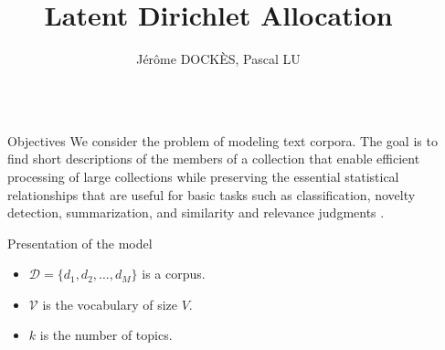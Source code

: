 \documentclass[final]{beamer}
\title{Latent Dirichlet Allocation} %
\author{J\'er\^ome DOCK\`ES, Pascal LU} %
\institute{\'Ecole Normale Sup\'erieure de Cachan $-$ \today} %
\newlength{\sepwid}
\newlength{\onecolwid}
\begin{document}

\setlength{\belowcaptionskip}{2ex} %
\setlength\belowdisplayshortskip{2ex} %

\begin{frame}[t] %

\begin{columns}[t] %

\begin{column}{\sepwid}\end{column} %

\begin{column}{\onecolwid} %


\begin{alertblock}{Objectives}
We consider the problem of modeling text corpora. The goal is to find short descriptions of the members of a collection that enable efficient processing of large collections while preserving the essential statistical relationships that are useful for basic tasks such as classification, novelty detection, summarization, and similarity and relevance judgments  \cite{BNJ03}.
\end{alertblock}


\begin{block}{Presentation of the model}

\begin{itemize}
  \item $\mathcal{D} = \{d_{1},d_{2}, \ldots, d_{M}\}$ is a corpus.
  \item $\mathcal{V}$ is the vocabulary of size $V$.
  \item $k$ is the number of topics.
\end{itemize}


\end{block}
\end{column}
\end{columns}
\end{frame}
\end{document}
